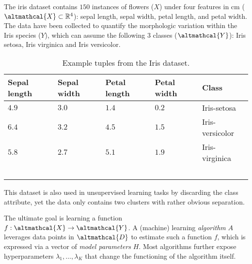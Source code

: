 \begin{example}\label{ex:dataset}
    The iris dataset contains $150$ instances of flowers ($X$) under four features in cm ($\altmathcal{X} \subset \mathbb{R}^4$): sepal length, sepal width, petal length, and petal width.
    The data have been collected to quantify the morphologic variation within the Iris species ($Y$), which can assume the following $3$ classes ($\altmathcal{Y}$): Iris setosa, Iris virginica and Iris versicolor.
    \begin{table}[!h]
        \centering
        \begin{tabular}{llll|l}
            \hline
            Sepal length & Sepal width & Petal length & Petal width & Class \\ \hline
            $4.9$ & $3.0$ & $1.4$ & $0.2$ & Iris-setosa \\
            $6.4$ & $3.2$ & $4.5$ & $1.5$ & Iris-versicolor \\
            $5.8$ & $2.7$ & $5.1$ & $1.9$ & Iris-virginica \\ \hline
            \
        \end{tabular}
        \caption{Example tuples from the Iris dataset.}
        \label{tbl:iris}
    \end{table}

    \noindent This dataset is also used in unsupervised learning tasks by discarding the class attribute, yet the data only contains two clusters with rather obvious separation.
\end{example}

The ultimate goal is learning a function $f: \altmathcal{X} \rightarrow \altmathcal{Y}$.
A (machine) learning \textit{algorithm} $A$ leverages data points in $\altmathcal{D}$ to estimate such a function $f$, which is expressed via a vector of \textit{model parameters} $H$.
Most algorithms further expose hyperparameters $\lambda_1, \dots, \lambda_K$ that change the functioning of the algorithm itself.

